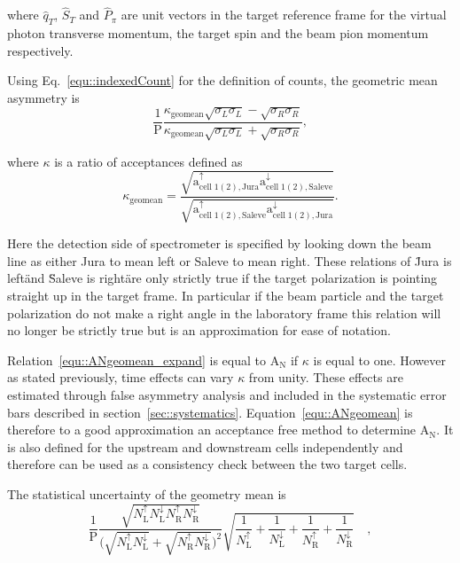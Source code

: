 \noindent
where $\hat{q}_T$, $\hat{S}_T$ and $\hat{P}_{\pi}$ are unit vectors in the
target reference frame for the virtual photon transverse momentum, the target
spin and the beam pion momentum respectively.

Using Eq.~\ref{equ::indexedCount} for the definition of counts, the geometric
mean asymmetry is
\begin{equation}
  \label{equ::ANgeomean_expand}
  \frac{1}{\mathrm{P}}\frac{\kappa_{\mathrm{geomean}}
    \sqrt{\sigma_{L}\sigma_{L}} -
    \sqrt{\sigma_{R}\sigma_{R}}}{\kappa_{\mathrm{geomean}}
    \sqrt{\sigma_{L}\sigma_{L}} + \sqrt{\sigma_{R}\sigma_{R}}},
\end{equation}

\noindent
where $\kappa$ is a ratio of acceptances defined as
\begin{equation}
  \kappa_{\mathrm{geomean}} =
  \frac{\sqrt{\mathrm{a}^{\uparrow}_{\mathrm{cell\;1(2),Jura}}
      \mathrm{a}^{\downarrow}_{\mathrm{cell\;1(2),Saleve}}}}
       {\sqrt{\mathrm{a}^{\uparrow}_{\mathrm{cell\;1(2),Saleve}}
           \mathrm{a}^{\downarrow}_{\mathrm{cell\;1(2),Jura}}}}.
       \label{equ::accGeoMean}
\end{equation}

\noindent
Here the detection side of spectrometer is specified by looking down the beam
line as either Jura to mean left or Saleve to mean right.  These relations of
\"Jura is left\" and \"Saleve is right\" are only strictly true if the target
polarization is pointing straight up in the target frame.  In particular if the
beam particle and the target polarization do not make a right angle in the
laboratory frame this relation will no longer be strictly true but is an
approximation for ease of notation.

Relation~\ref{equ::ANgeomean_expand} is equal to A$_{\mathrm{N}}$ if $\kappa$ is
equal to one.  However as stated previously, time effects can vary $\kappa$ from
unity. These effects are estimated through false asymmetry analysis and included
in the systematic error bars described in section~\ref{sec::systematics}.
Equation~\ref{equ::ANgeomean} is therefore to a good approximation an acceptance
free method to determine A$_{\mathrm{N}}$.  It is also defined for the upstream
and downstream cells independently and therefore can be used as a consistency
check between the two target cells.

The statistical uncertainty of the geometry mean is
\begin{equation}
  \frac{1}{\mathrm{P}}
  \frac{
    \sqrt{
      N_{\mathrm{L}}^{\uparrow}N_{\mathrm{L}}^{\downarrow}
      N_{\mathrm{ R}}^{\uparrow}N_{\mathrm{R}}^{\downarrow}
    }
  }{
    \Big( \sqrt{N_{\mathrm{L}}^{\uparrow}N_{\mathrm{L}}^{\downarrow}} +
    \sqrt{N_{\mathrm{R}}^{\uparrow}N_{\mathrm{R}}^{\downarrow}} \Big)^2
  }
  \sqrt{
    \frac{1}{N_{\mathrm{L}}^{\uparrow}} +
    \frac{1}{N_{\mathrm{L}}^{\downarrow}} +
    \frac{1}{N_{\mathrm{R}}^{\uparrow}} +
    \frac{1}{N_{\mathrm{R}}^{\downarrow}}
  } \quad,
\end{equation}

